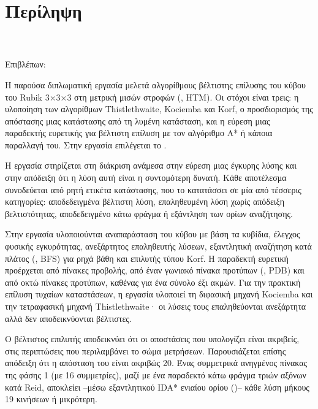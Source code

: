 \chapter*{Περίληψη}

\begin{center}
\textbf{\thesisGreekTitle}\\[0.25cm]
\thesisStudentName\\
Επιβλέπων: \thesisSupervisor
\end{center}

Η παρούσα διπλωματική εργασία μελετά αλγορίθμους βέλτιστης επίλυσης του κύβου του Rubik 3×3×3 στη μετρική μισών στροφών (, HTM). Οι στόχοι είναι τρεις: η υλοποίηση των αλγορίθμων Thistlethwaite, Kociemba και Korf, ο προσδιορισμός της απόστασης μιας κατάστασης από τη λυμένη κατάσταση, και η εύρεση μιας παραδεκτής ευρετικής για βέλτιστη επίλυση με τον αλγόριθμο A* ή κάποια παραλλαγή του. Στην εργασία επιλέγεται το .

Η εργασία στηρίζεται στη διάκριση ανάμεσα στην εύρεση μιας έγκυρης λύσης και στην απόδειξη ότι η λύση αυτή είναι η συντομότερη δυνατή. Κάθε αποτέλεσμα συνοδεύεται από ρητή ετικέτα κατάστασης, που το κατατάσσει σε μία από τέσσερις κατηγορίες: αποδεδειγμένα βέλτιστη λύση, επαληθευμένη λύση χωρίς απόδειξη βελτιστότητας, αποδεδειγμένο κάτω φράγμα ή εξάντληση των ορίων αναζήτησης.

Στην εργασία υλοποιούνται αναπαράσταση του κύβου με βάση τα κυβίδια, έλεγχος φυσικής εγκυρότητας, ανεξάρτητος επαληθευτής λύσεων, εξαντλητική αναζήτηση κατά πλάτος (, BFS) για ρηχά βάθη και επιλυτής  τύπου Korf. Η παραδεκτή ευρετική προέρχεται από πίνακες προβολής, από έναν γωνιακό πίνακα προτύπων (, PDB) και από οκτώ πίνακες προτύπων, καθένας για ένα σύνολο έξι ακμών. Για την πρακτική επίλυση τυχαίων καταστάσεων, η εργασία υλοποιεί τη διφασική μηχανή Kociemba και την τετραφασική μηχανή Thistlethwaite· οι λύσεις τους επαληθεύονται ανεξάρτητα αλλά δεν αποδεικνύονται βέλτιστες.

Ο βέλτιστος επιλυτής αποδεικνύει ότι οι αποστάσεις που υπολογίζει είναι ακριβείς, στις περιπτώσεις που περιλαμβάνει το σώμα μετρήσεων. Παρουσιάζεται επίσης απόδειξη ότι η απόσταση του  είναι ακριβώς 20. Ένας συμμετρικά ανηγμένος πίνακας  της φάσης 1 (με 16 συμμετρίες), μαζί με ένα παραδεκτό κάτω φράγμα τριών αξόνων κατά Reid, αποκλείει --μέσω εξαντλητικού IDA* ενιαίου ορίου ()-- κάθε λύση μήκους 19 κινήσεων ή μικρότερη.

